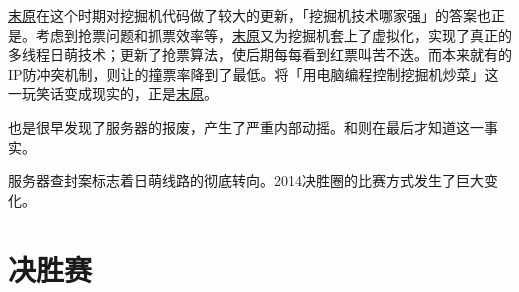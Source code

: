 \uline{末原}在这个时期对挖掘机代码做了较大的更新，「挖掘机技术哪家强」的答案也正是。考虑到抢票问题和抓票效率等，\uline{末原}又为挖掘机套上了虚拟化，实现了真正的多线程日萌技术；更新了抢票算法，使后期每每看到红票叫苦不迭。而本来就有的IP防冲突机制，则让的撞票率降到了最低。将「用电脑编程控制挖掘机炒菜」这一玩笑话变成现实的，正是\uline{末原}。

也是很早发现了服务器的报废，产生了严重内部动摇。和则在最后才知道这一事实。

服务器查封案标志着日萌线路的彻底转向。2014决胜圈的比赛方式发生了巨大变化。

\chapter{决胜赛}

